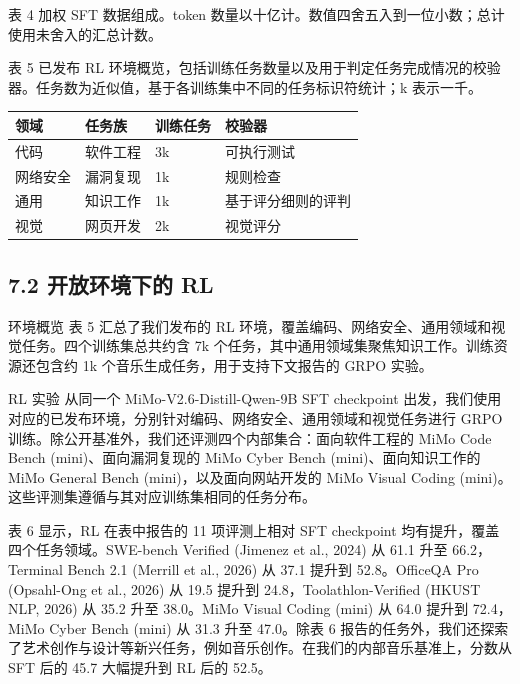 表 4 加权 SFT 数据组成。token 数量以十亿计。数值四舍五入到一位小数；总计使用未舍入的汇总计数。

表 5 已发布 RL 环境概览，包括训练任务数量以及用于判定任务完成情况的校验器。任务数为近似值，基于各训练集中不同的任务标识符统计；k 表示一千。

{\def\LTcaptype{none} %
\begin{longtable}[]{@{}|l|l|l|l|@{}}
\toprule\noalign{}
\endhead
\bottomrule\noalign{}
\endlastfoot
\hline
领域 & 任务族 & 训练任务 & 校验器 \\
\hline
代码 & 软件工程 & 3k & 可执行测试 \\
\hline
网络安全 & 漏洞复现 & 1k & 规则检查 \\
\hline
通用 & 知识工作 & 1k & 基于评分细则的评判 \\
\hline
视觉 & 网页开发 & 2k & 视觉评分 \\
\hline
\end{longtable}
}

\subsection{7.2 开放环境下的 RL}\label{rl-with-open-environments}

环境概览 表 5 汇总了我们发布的 RL 环境，覆盖编码、网络安全、通用领域和视觉任务。四个训练集总共约含 7k 个任务，其中通用领域集聚焦知识工作。训练资源还包含约 1k 个音乐生成任务，用于支持下文报告的 GRPO 实验。

RL 实验 从同一个 MiMo-V2.6-Distill-Qwen-9B SFT checkpoint 出发，我们使用对应的已发布环境，分别针对编码、网络安全、通用领域和视觉任务进行 GRPO 训练。除公开基准外，我们还评测四个内部集合：面向软件工程的 MiMo Code Bench (mini)、面向漏洞复现的 MiMo Cyber Bench (mini)、面向知识工作的 MiMo General Bench (mini)，以及面向网站开发的 MiMo Visual Coding (mini)。这些评测集遵循与其对应训练集相同的任务分布。

表 6 显示，RL 在表中报告的 11 项评测上相对 SFT checkpoint 均有提升，覆盖四个任务领域。SWE-bench Verified (Jimenez et al., 2024) 从 61.1 升至 66.2，Terminal Bench 2.1 (Merrill et al., 2026) 从 37.1 提升到 52.8。OfficeQA Pro (Opsahl-Ong et al., 2026) 从 19.5 提升到 24.8，Toolathlon-Verified (HKUST NLP, 2026) 从 35.2 升至 38.0。MiMo Visual Coding (mini) 从 64.0 提升到 72.4，MiMo Cyber Bench (mini) 从 31.3 升至 47.0。除表 6 报告的任务外，我们还探索了艺术创作与设计等新兴任务，例如音乐创作。在我们的内部音乐基准上，分数从 SFT 后的 45.7 大幅提升到 RL 后的 52.5。



